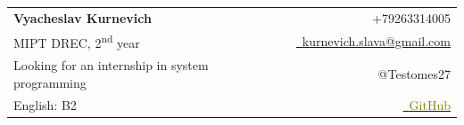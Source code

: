 \documentclass[a4paper,11pt]{article}
\makeatletter
\newcommand{\resumeSubheading}[4]{
\vspace{0.5mm}\item
    \begin{tabular*}{0.98\textwidth}[t]{l@{\extracolsep{\fill}}r}
        \textbf{#1} & \textit{\footnotesize{#4}} \\
        \textit{\footnotesize{#3}} &  \footnotesize{#2}\\
    \end{tabular*}
    \vspace{-2.4mm}
}
\newcommand{\resumeSubHeadingListStart}{\begin{itemize}[leftmargin=*,labelsep=0mm]}
\newcommand{\resumeItemListStart}{\begin{justify}\begin{itemize}[leftmargin=3ex, rightmargin=2ex, noitemsep,labelsep=1.2mm,itemsep=0mm]\small}
\newcommand{\resumeSubHeadingListEnd}{\end{itemize}\vspace{2mm}}
\newcommand{\resumeItemListEnd}{\end{itemize}\end{justify}\vspace{-2mm}}
\newcommand{\name}{Vyacheslav Kurnevich} %
\newcommand{\course}{MIPT DREC} %
\newcommand{\roll}{2} %
\newcommand{\phone}{+79263314005} %
\newcommand{\emaila}{kurnevich.slava@gmail.com} %
\makeatother
\begin{document}
\selectfont



\parbox{\linewidth}{
\begin{tabularx}{\linewidth}{L r} \\
  \textbf{\Large \name} & {\raisebox{0.0\height}{\footnotesize \faPhone}\ \phone}\\
  {\course, \roll\textsuperscript{nd} year} & \href{mailto:\emaila}{\raisebox{0.0\height}{\footnotesize \faEnvelope}\ {\emaila}} \\
  Looking for an internship in system programming &  {\raisebox{0.0\height}{\footnotesize \faTelegram}\ {@Testomes27}} \\
   English: B2 &  \href{https://github.com/kand1bober/}{\raisebox{0.0\height}{\footnotesize \faGithub}\ \textcolor{olive}{{GitHub}}} \\
\end{tabularx}
}





    
\end{document}
